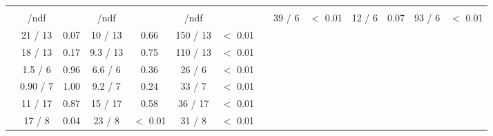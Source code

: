 \begin{table}
\begin{tabular}{ccccccc}
		&	  & 	  & 	 \multicolumn{2}{c}{\mgamcMLMpythia} \\ 
		\vspace*{0.02cm} &	\chis/ndf & \pvalue &	\chis/ndf & \pvalue &	\chis/ndf & \pvalue &			\hline
		\vspace*{0.02cm} \NJET &	39 / 6 &	 $<$ 0.01 &	12 / 6 &	 0.07 &	93 / 6 &	 $<$ 0.01 \\
		\vspace*{0.02cm} \HT &	21 / 13 &	 0.07 &	10 / 13 &	 0.66 &	150 / 13 &	 $<$ 0.01 \\
		\vspace*{0.02cm} \ST &	18 / 13 &	 0.17 &	9.3 / 13 &	 0.75 &	110 / 13 &	 $<$ 0.01 \\
		\vspace*{0.02cm} \ptmiss &	1.5 / 6 &	 0.96 &	6.6 / 6 &	 0.36 &	26 / 6 &	 $<$ 0.01 \\
		\vspace*{0.02cm} \WPT &	0.90 / 7 &	 1.00 &	9.2 / 7 &	 0.24 &	33 / 7 &	 $<$ 0.01 \\
		\vspace*{0.02cm} \LPT &	11 / 17 &	 0.87 &	15 / 17 &	 0.58 &	36 / 17 &	 $<$ 0.01 \\
		\vspace*{0.02cm} \LETA &	17 / 8 &	 0.04 &	23 / 8 &	 $<$ 0.01 &	31 / 8 &	 $<$ 0.01 \\
	\end{tabular}
\end{table}